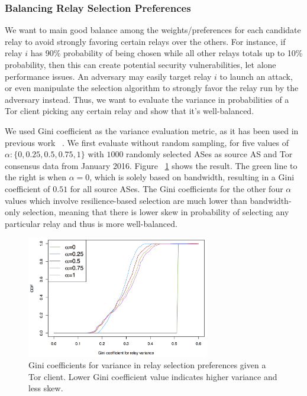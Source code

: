 \subsubsection{Balancing Relay Selection Preferences} 
We want to main good balance among the weights/preferences for each candidate relay to avoid strongly favoring certain relays over the others. For instance, if relay $i$ has 90\% probability of being chosen while all other relays totals up to 10\% probability, then this can create potential security vulnerabilities, let alone performance issues. An adversary may easily target relay $i$ to launch an attack, or even manipulate the selection algorithm to strongly favor the relay run by the adversary instead. Thus, we want to evaluate the variance in probabilities of a Tor client picking any certain relay and show that it's well-balanced. 

We used Gini coefficient as the variance evaluation metric, as it has been used in previous work ~\cite{akhoondi2012lastor}. We first evaluate without random sampling, for five values of $\alpha: \{0, 0.25, 0.5, 0.75, 1\}$ with $1000$ randomly selected ASes as source AS and Tor consensus data from January 2016. Figure ~\ref{fig_gini} shows the result. The green line to the right is when $\alpha = 0$, which is solely based on bandwidth, resulting in a Gini coefficient of $0.51$ for all source ASes. The Gini coefficients for the other four $\alpha$ values which involve resilience-based selection are much lower than bandwidth-only selection, meaning that there is lower skew in probability of selecting any particular relay and thus is more well-balanced. 

\begin{figure}[ht!]
\centering
\includegraphics[width=80mm]{figure/gini_relay_variance}
\caption{Gini coefficients for variance in relay selection preferences given a Tor client. Lower Gini coefficient value indicates higher variance and less skew. \label{fig_gini}}
\end{figure}

